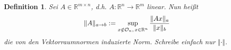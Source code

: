\documentclass[12pt]{article}
\theoremstyle{break}
\newtheorem{definition}[theorem]{Definition}
\newtheorem{comment}[theorem]{Bemerkung}
\begin{document}
\begin{definition}
Sei $A\in \mathbb{R}^{m \times n}$, d.h. $A: \mathbb{R}^n \rightarrow \mathbb{R}^m$ linear. Nun heißt
$$\Vert A \Vert_{a \rightarrow b} := \sup_{x \notin \mathcal{O}_n, \thinspace x \in \mathbb{R}^n} \frac{\Vert Ax \Vert_a}{\Vert x\Vert_b}$$
die von den Vektorraumnormen induzierte Norm. Schreibe einfach nur $\Vert \cdot \Vert$.
\end{definition}

\begin{comment}
Sei $A \in \mathbb{R}^{n\times m}$, $\alpha \in \mathbb{R}$ Es gilt für die in (18.3) definierte Matrixnorm
\begin{enumerate}
  \item[i)] $\forall x \in \mathbb{R}^n: \medspace \Vert Ax \Vert \leq \Vert A \Vert \Vert x \Vert$ \\
  $\Vert A \Vert$ ist die kleinste Zahl mit dieser Eigenschaft
  \item[ii)] Es gilt $\Vert A \Vert \geq 0$. Weiter gilt $\Vert A \Vert = 0 \Rightarrow \medspace A = 0$
  \item[iii)] $\Vert \alpha A \Vert = \vert \alpha \vert \Vert A \Vert$
  \item[iv)] $\Vert A + B \Vert \leq \Vert A \Vert + \Vert B \Vert$.\\
	Damit ist $\Vert \cdot \Vert$ tatsächlich eine Norm.
  \item[v)] $\Vert I \Vert = 1$ falls $m=n$, $\Vert \cdot \Vert_{\mathbb{R}^m} = \Vert \cdot \Vert_{\mathbb{R}^n}$
  \item[vi)] $\Vert AB \Vert \leq \Vert A \Vert \thinspace \Vert B \Vert$ (Submultiplikativität)
\end{enumerate}
\end{comment}
\end{document}
